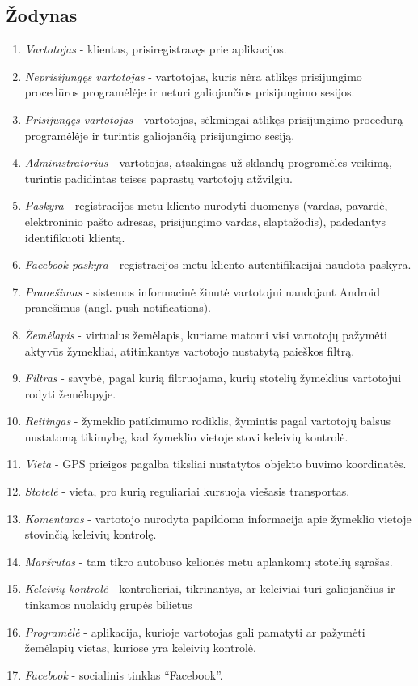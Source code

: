 \documentclass{VUMIFPSkursinis}
\begin{document}
\subsection{Žodynas}
				\begin{enumerate}[label=E\arabic*,itemsep=-2mm]
					\item \textit{Vartotojas} - klientas, prisiregistravęs prie aplikacijos.
					\item \textit{Neprisijungęs vartotojas} - vartotojas, kuris nėra atlikęs prisijungimo procedūros programėlėje ir neturi galiojančios prisijungimo sesijos.
					\item \textit{Prisijungęs vartotojas} - vartotojas, sėkmingai atlikęs prisijungimo procedūrą programėlėje ir turintis galiojančią prisijungimo sesiją.
					\item \textit{Administratorius} - vartotojas, atsakingas už sklandų programėlės veikimą, turintis padidintas teises paprastų vartotojų atžvilgiu.
					\item \textit{Paskyra} - registracijos metu kliento nurodyti duomenys (vardas, pavardė, elektroninio pašto adresas, prisijungimo vardas, slaptažodis), padedantys identifikuoti klientą.
					\item \textit{Facebook paskyra} - registracijos metu kliento autentifikacijai naudota paskyra.
					\item \textit{Pranešimas} - sistemos informacinė žinutė vartotojui naudojant Android pranešimus (angl. push notifications).
					\item \textit{Žemėlapis} - virtualus žemėlapis, kuriame matomi visi vartotojų pažymėti aktyvūs žymekliai, atitinkantys vartotojo nustatytą paieškos filtrą.
					\item \textit{Filtras} - savybė, pagal kurią filtruojama, kurių stotelių žymeklius vartotojui rodyti žemėlapyje.
					\item \textit{Reitingas} - žymeklio patikimumo rodiklis, žymintis pagal vartotojų balsus nustatomą tikimybę, kad žymeklio vietoje stovi keleivių kontrolė. 
					\item \textit{Vieta} - GPS prieigos pagalba tiksliai nustatytos objekto buvimo koordinatės.
					\item \textit{Stotelė} - vieta, pro kurią reguliariai kursuoja viešasis transportas.
					\item \textit{Komentaras} - vartotojo nurodyta papildoma informacija apie žymeklio vietoje stovinčią keleivių kontrolę.
					\item \textit{Maršrutas} - tam tikro autobuso kelionės metu aplankomų stotelių sąrašas.
					\item \textit{Keleivių kontrolė} - kontrolieriai, tikrinantys, ar keleiviai turi galiojančius ir tinkamos nuolaidų grupės bilietus
					\item \textit{Programėlė} - aplikacija, kurioje vartotojas gali pamatyti ar pažymėti žemėlapių vietas, kuriose yra keleivių kontrolė.
					\item \textit{Facebook} - socialinis tinklas “Facebook”.
				\end{enumerate}
\end{document}
